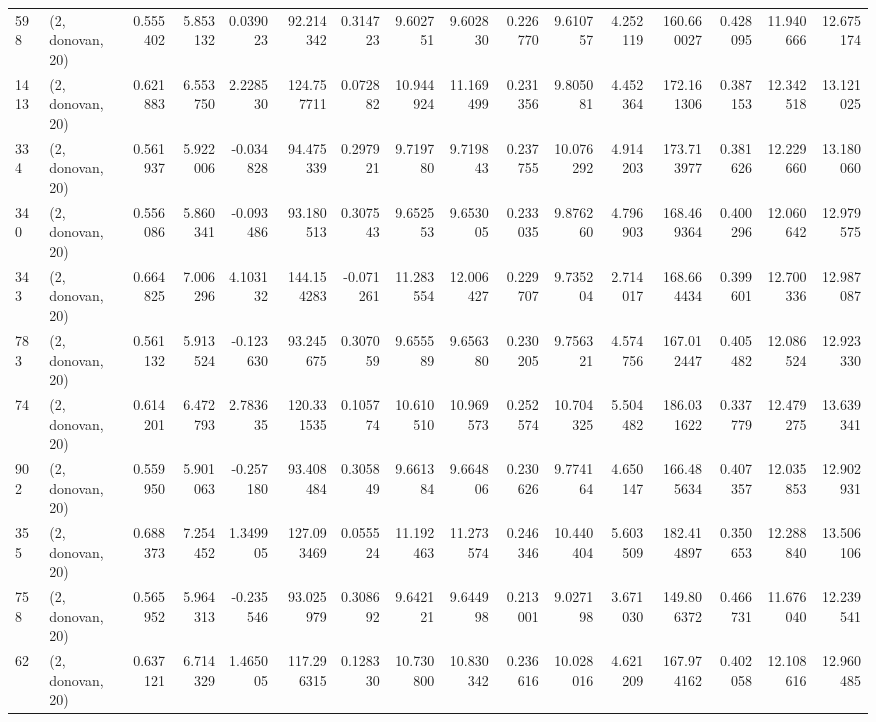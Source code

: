 \begin{tabular}{llrrrrrrrrrrrrrr}
598  &  (2, donovan, 20) &   0.555402 &   5.853132 &   0.039023 &     92.214342 &    0.314723 &    9.602751 &    9.602830 &  0.226770 &   9.610757 &   4.252119 &   160.660027 &   0.428095 &  11.940666 &  12.675174 \\
1413 &  (2, donovan, 20) &   0.621883 &   6.553750 &   2.228530 &    124.757711 &    0.072882 &   10.944924 &   11.169499 &  0.231356 &   9.805081 &   4.452364 &   172.161306 &   0.387153 &  12.342518 &  13.121025 \\
334  &  (2, donovan, 20) &   0.561937 &   5.922006 &  -0.034828 &     94.475339 &    0.297921 &    9.719780 &    9.719843 &  0.237755 &  10.076292 &   4.914203 &   173.713977 &   0.381626 &  12.229660 &  13.180060 \\
340  &  (2, donovan, 20) &   0.556086 &   5.860341 &  -0.093486 &     93.180513 &    0.307543 &    9.652553 &    9.653005 &  0.233035 &   9.876260 &   4.796903 &   168.469364 &   0.400296 &  12.060642 &  12.979575 \\
343  &  (2, donovan, 20) &   0.664825 &   7.006296 &   4.103132 &    144.154283 &   -0.071261 &   11.283554 &   12.006427 &  0.229707 &   9.735204 &   2.714017 &   168.664434 &   0.399601 &  12.700336 &  12.987087 \\
783  &  (2, donovan, 20) &   0.561132 &   5.913524 &  -0.123630 &     93.245675 &    0.307059 &    9.655589 &    9.656380 &  0.230205 &   9.756321 &   4.574756 &   167.012447 &   0.405482 &  12.086524 &  12.923330 \\
74   &  (2, donovan, 20) &   0.614201 &   6.472793 &   2.783635 &    120.331535 &    0.105774 &   10.610510 &   10.969573 &  0.252574 &  10.704325 &   5.504482 &   186.031622 &   0.337779 &  12.479275 &  13.639341 \\
902  &  (2, donovan, 20) &   0.559950 &   5.901063 &  -0.257180 &     93.408484 &    0.305849 &    9.661384 &    9.664806 &  0.230626 &   9.774164 &   4.650147 &   166.485634 &   0.407357 &  12.035853 &  12.902931 \\
355  &  (2, donovan, 20) &   0.688373 &   7.254452 &   1.349905 &    127.093469 &    0.055524 &   11.192463 &   11.273574 &  0.246346 &  10.440404 &   5.603509 &   182.414897 &   0.350653 &  12.288840 &  13.506106 \\
758  &  (2, donovan, 20) &   0.565952 &   5.964313 &  -0.235546 &     93.025979 &    0.308692 &    9.642121 &    9.644998 &  0.213001 &   9.027198 &   3.671030 &   149.806372 &   0.466731 &  11.676040 &  12.239541 \\
62   &  (2, donovan, 20) &   0.637121 &   6.714329 &   1.465005 &    117.296315 &    0.128330 &   10.730800 &   10.830342 &  0.236616 &  10.028016 &   4.621209 &   167.974162 &   0.402058 &  12.108616 &  12.960485 \\

\end{tabular}
